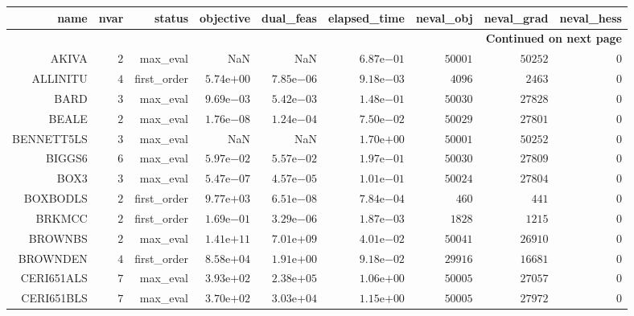 \begin{longtable}{rrrrrrrrr}
\hline
name & nvar & status & objective & dual\_feas & elapsed\_time & neval\_obj & neval\_grad & neval\_hess \\\hline
\endhead
\hline
\multicolumn{9}{r}{{\bfseries Continued on next page}}\\
\hline
\endfoot
\endlastfoot
AKIVA & \(     2\) & max\_eval &       NaN &       NaN & \( 6.87\)e\(-01\) & \( 50001\) & \( 50252\) & \(     0\) \\
ALLINITU & \(     4\) & first\_order & \( 5.74\)e\(+00\) & \( 7.85\)e\(-06\) & \( 9.18\)e\(-03\) & \(  4096\) & \(  2463\) & \(     0\) \\
BARD & \(     3\) & max\_eval & \( 9.69\)e\(-03\) & \( 5.42\)e\(-03\) & \( 1.48\)e\(-01\) & \( 50030\) & \( 27828\) & \(     0\) \\
BEALE & \(     2\) & max\_eval & \( 1.76\)e\(-08\) & \( 1.24\)e\(-04\) & \( 7.50\)e\(-02\) & \( 50029\) & \( 27801\) & \(     0\) \\
BENNETT5LS & \(     3\) & max\_eval &       NaN &       NaN & \( 1.70\)e\(+00\) & \( 50001\) & \( 50252\) & \(     0\) \\
BIGGS6 & \(     6\) & max\_eval & \( 5.97\)e\(-02\) & \( 5.57\)e\(-02\) & \( 1.97\)e\(-01\) & \( 50030\) & \( 27809\) & \(     0\) \\
BOX3 & \(     3\) & max\_eval & \( 5.47\)e\(-07\) & \( 4.57\)e\(-05\) & \( 1.01\)e\(-01\) & \( 50024\) & \( 27804\) & \(     0\) \\
BOXBODLS & \(     2\) & first\_order & \( 9.77\)e\(+03\) & \( 6.51\)e\(-08\) & \( 7.84\)e\(-04\) & \(   460\) & \(   441\) & \(     0\) \\
BRKMCC & \(     2\) & first\_order & \( 1.69\)e\(-01\) & \( 3.29\)e\(-06\) & \( 1.87\)e\(-03\) & \(  1828\) & \(  1215\) & \(     0\) \\
BROWNBS & \(     2\) & max\_eval & \( 1.41\)e\(+11\) & \( 7.01\)e\(+09\) & \( 4.01\)e\(-02\) & \( 50041\) & \( 26910\) & \(     0\) \\
BROWNDEN & \(     4\) & first\_order & \( 8.58\)e\(+04\) & \( 1.91\)e\(+00\) & \( 9.18\)e\(-02\) & \( 29916\) & \( 16681\) & \(     0\) \\
CERI651ALS & \(     7\) & max\_eval & \( 3.93\)e\(+02\) & \( 2.38\)e\(+05\) & \( 1.06\)e\(+00\) & \( 50005\) & \( 27057\) & \(     0\) \\
CERI651BLS & \(     7\) & max\_eval & \( 3.70\)e\(+02\) & \( 3.03\)e\(+04\) & \( 1.15\)e\(+00\) & \( 50005\) & \( 27972\) & \(     0\) \\

\end{longtable}
